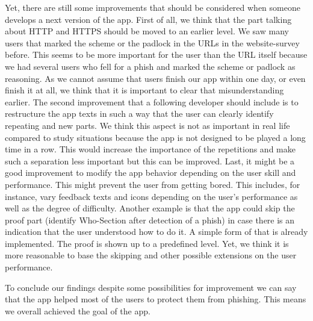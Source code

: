 Yet, there are still some improvements that should be considered when someone develops a next version of the app.
First of all, we think that the part talking about HTTP and HTTPS should be moved to an earlier level.
We saw many users that marked the scheme or the padlock in the URLs in the website-survey before.
This seems to be more important for the user than the URL itself because we had several users who fell for a phish and marked the scheme or padlock as reasoning.
As we cannot assume that users finish our app within one day, or even finish it at all, we think that it is important to clear that misunderstanding earlier.
The second improvement that a following developer should include is to restructure the app texts in such a way that the user can clearly identify repeating and new parts.
We think this aspect is not as important in real life compared to study situations because the app is not designed to be played a long time in a row.
This would increase the importance of the repetitions and make such a separation less important but this can be improved.
Last, it might be a good improvement to modify the app behavior depending on the user skill and performance.
This might prevent the user from getting bored.
This includes, for instance, vary feedback texts and icons depending on the user's performance as well as the degree of difficulty.
Another example is that the app could skip the proof part (identify Who-Section after detection of a phish) in case there is an indication that the user understood how to do it.
A simple form of that is already implemented.
The proof is shown up to a predefined level.
Yet, we think it is more reasonable to base the skipping and other possible extensions on the user performance. 

To conclude our findings despite some possibilities for improvement we can say that the app helped most of the users to protect them from phishing. This means we overall achieved the goal of the app.
